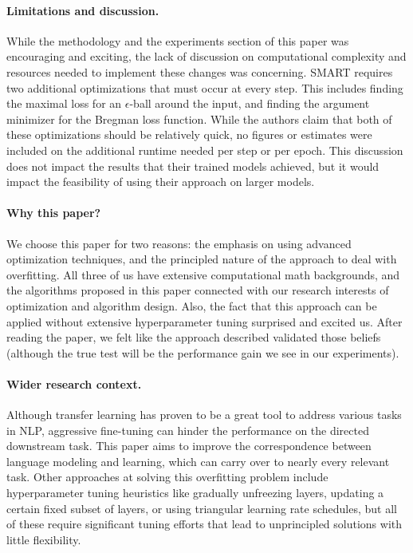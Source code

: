 \documentclass{article}
\begin{document}
\paragraph{Limitations and discussion.}
While the methodology and the experiments section of this paper was encouraging and exciting, the lack of discussion on computational complexity and resources needed to implement these changes was concerning. SMART requires two additional optimizations that must occur at every step. This includes finding the maximal loss for an $\epsilon$-ball around the input, and finding the argument minimizer for the Bregman loss function. While the authors claim that both of these optimizations should be relatively quick, no figures or estimates were included on the additional runtime needed per step or per epoch. This discussion does not impact the results that their trained models achieved, but it would impact the feasibility of using their approach on larger models. 

\paragraph{Why this paper?}
We choose this paper for two reasons: the emphasis on using advanced optimization techniques, and the principled nature of the approach to deal with overfitting. All three of us have extensive computational math backgrounds, and the algorithms proposed in this paper connected with our research interests of optimization and algorithm design. Also, the fact that this approach can be applied without extensive hyperparameter tuning surprised and excited us. After reading the paper, we felt like the approach described validated those beliefs (although the true test will be the performance gain we see in our experiments).

\paragraph{Wider research context.}
Although transfer learning has proven to be a great tool to address various tasks in NLP, aggressive fine-tuning can hinder the performance on the directed downstream task. This paper aims to improve the correspondence between language modeling and learning, which can carry over to nearly every relevant task. Other approaches at solving this overfitting problem include hyperparameter tuning heuristics like gradually unfreezing layers, updating a certain fixed subset of layers, or using triangular learning rate schedules, but all of these require significant tuning efforts that lead to unprincipled solutions with little flexibility. 
\end{document}
